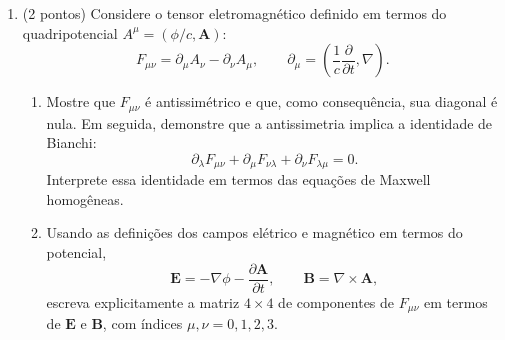 \begin{enumerate}
\begin{enumerate}
              \item Utilizando o invariante de Lorentz $p^\mu p_\mu = -m^2 c^2$ e a
                    relação do item anterior, deduza a equação de dispersão relativística:
                    $$
                        E^2 = p^2 c^2 + m^2 c^4.
                    $$
                    Em seguida, reescreva essa expressão na forma
                    $$
                        \frac{E}{mc^2} = \sqrt{1 + \left(\frac{p}{mc}\right)^2}.
                    $$
                    Discuta o que ocorre no limite $p \ll mc$ e no limite $p \gg mc$.

              \item Um elétron (massa $m_e$) possui energia total $E = 3 m_e c^2$.
                    Determine sua velocidade $v$ em unidades de $c$ e o fator de
                    Lorentz $\gamma$. Calcule também o momento linear $p$ em unidades
                    de $m_e c$ e mostre que, para essa energia, $p > 2 m_e c$. Comente
                    por que esse resultado é esperado fisicamente.
          \end{enumerate}

    \item (2 pontos) Considere o tensor eletromagnético definido em termos do
          quadripotencial $A^\mu = (\phi/c, \mathbf A)$:
          $$
              F_{\mu\nu}
              =
              \partial_\mu A_\nu
              -
              \partial_\nu A_\mu,
              \qquad
              \partial_\mu = \left(\frac{1}{c}\frac{\partial}{\partial t}, \nabla\right).
          $$

          \begin{enumerate}
              \item Mostre que $F_{\mu\nu}$ é antissimétrico e que, como consequência,
                    sua diagonal é nula. Em seguida, demonstre que a antissimetria implica a
                    identidade de Bianchi:
                    $$
                        \partial_\lambda F_{\mu\nu} + \partial_\mu F_{\nu\lambda} + \partial_\nu F_{\lambda\mu} = 0.
                    $$
                    Interprete essa identidade em termos das equações de Maxwell
                    homogêneas.

              \item Usando as definições dos campos elétrico e magnético em termos do potencial,
                    $$
                        \mathbf E = -\nabla \phi - \frac{\partial \mathbf A}{\partial t}, \qquad \mathbf B = \nabla \times \mathbf A,
                    $$
                    escreva explicitamente a matriz $4\times 4$ de componentes de
                    $F_{\mu\nu}$ em termos de $\mathbf E$ e $\mathbf B$, com índices
                    $\mu,\nu = 0,1,2,3$.
          \end{enumerate}



\end{enumerate}
